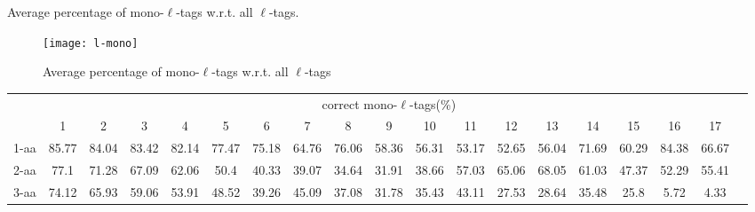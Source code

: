 \documentclass{article}[12pt]
\begin{document}
\begin{landscape}
\begin{table}[h]
\caption{ Average percentage of mono-$\ell$-tags w.r.t. all $\ell$-tags.}
\label{table:l-mono}

\vspace{3mm}
\end{table}
\end{landscape}

\begin{figure}
  \begin{center}
\texttt{[image: l-mono]}
\end{center}
\caption{Average percentage of mono-$\ell$-tags w.r.t. all $\ell$-tags}
  \label{fig:l-mono}
\end{figure}


\begin{landscape}

\begin{table}[h]\tiny
\vspace{3mm}
{\centering
\begin{center}
\begin{tabular}{|l|c|c|c|c|c|c|c|c|c|c|c|c|c|c|c|c|c|c|}
  \hline
  & \multicolumn{ 17 }{|c|}{correct mono-$\ell$-tags(\%)} \\
  \cline{2- 18}
    & 1 & 2 & 3 & 4 & 5 & 6 & 7 & 8 & 9 & 10 & 11 & 12 & 13 & 14 & 15 & 16 & 17\\
  \hline
1-aa  & 85.77 & 84.04 & 83.42 & 82.14 & 77.47 & 75.18 & 64.76 & 76.06 & 58.36 & 56.31 & 53.17 & 52.65 & 56.04 & 71.69 & 60.29 & 84.38 & 66.67\\
2-aa  & 77.1 & 71.28 & 67.09 & 62.06 & 50.4 & 40.33 & 39.07 & 34.64 & 31.91 & 38.66 & 57.03 & 65.06 & 68.05 & 61.03 & 47.37 & 52.29 & 55.41\\
3-aa  & 74.12 & 65.93 & 59.06 & 53.91 & 48.52 & 39.26 & 45.09 & 37.08 & 31.78 & 35.43 & 43.11 & 27.53 & 28.64 & 35.48 & 25.8 & 5.72 & 4.33\\
 \hline
\end{tabular}
\end{center}
\par}
\centering


\end{table}
\end{landscape}
\end{document}
